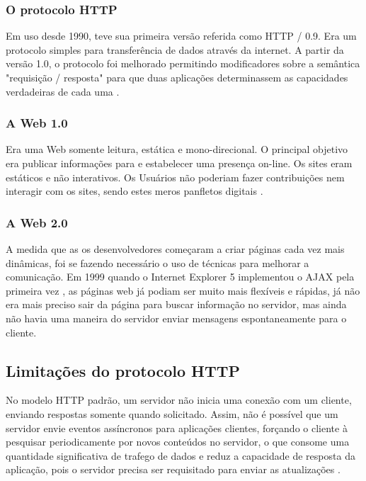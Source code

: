 \subsubsection{O protocolo HTTP}
Em uso desde 1990, teve sua primeira versão referida como HTTP / 0.9. Era um protocolo simples para transferência de dados através da internet. A partir da versão 1.0, o protocolo foi melhorado permitindo modificadores sobre a semântica "requisição / resposta" para que duas aplicações determinassem as capacidades verdadeiras de cada uma \citep[p.~7]{Fielding1999}.

\subsubsection{A Web 1.0}
Era uma Web somente leitura, estática e mono-direcional. O principal objetivo era publicar informações para e estabelecer uma presença on-line. Os sites eram estáticos e não interativos. Os Usuários não poderiam fazer contribuições nem interagir com os sites, sendo estes meros panfletos digitais \citep[p.~2-3]{Aghaei2012}.

\subsubsection{A Web 2.0}
A medida que as os desenvolvedores começaram a criar páginas cada vez mais dinâmicas, foi se fazendo necessário o uso de técnicas para melhorar a comunicação. Em 1999 quando o Internet Explorer 5 implementou o AJAX pela primeira vez \citep{Asleson2006}, as páginas web já podiam ser muito mais flexíveis e rápidas, já não era mais preciso sair da página para buscar informação no servidor, mas ainda não havia uma maneira do servidor enviar mensagens espontaneamente para o cliente.

\subsection{Limitações do protocolo HTTP}

No modelo HTTP padrão, um servidor não inicia uma conexão com um cliente, enviando respostas somente quando solicitado. Assim, não é possível que um servidor envie eventos assíncronos para aplicações clientes, forçando o cliente à pesquisar periodicamente por novos conteúdos no servidor, o que consome uma quantidade significativa de trafego de dados e reduz a capacidade de resposta da aplicação, pois o servidor precisa ser requisitado para enviar as atualizações \citep{Loreto2011}.

